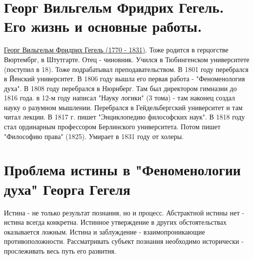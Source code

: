 \section{Георг Вильгельм Фридрих Гегель. Его жизнь и основные работы.}
\underline{Георг Вильгельм Фридрих Гегель (1770 - 1831)}. Тоже родится в герцогстве Вюртембрг, в Штутгарте. Отец - чиновник.
Учился в Тюбингенском университете (поступил в 18). Тоже подрабатывал преподавательством. В 1801 году перебрался в Йенский университет. В 1806 году вышла его первая работа - "Феноменология духа". В 1808 году перебрался в Нюрнберг. Там был директором гимназии до 1816 года. в 12-м году написал "Науку логики" (3 тома) - там наконец создал науку о разумном мышлении. Перебрался в Гейдельбергский университет и там читал лекции. В 1817 г. пишет "Энциклопедию философских наук". В 1818 году стал ординарным профессором Берлинского университета. Потом пишет "Философию права" (1825). Умирает в 1831 году от холеры.


 
\section{Проблема истины в "Феноменологии духа" Георга Гегеля}
Истина - не только результат познания, но и процесс. Абстрактной истины нет - истина всегда конкретна. Истинное утверждение в других обстоятельствах оказывается ложным. Истина и заблуждение - взаимопроникающие противоположности. Рассматривать субъект познания необходимо исторически - прослеживать весь путь его развития.

